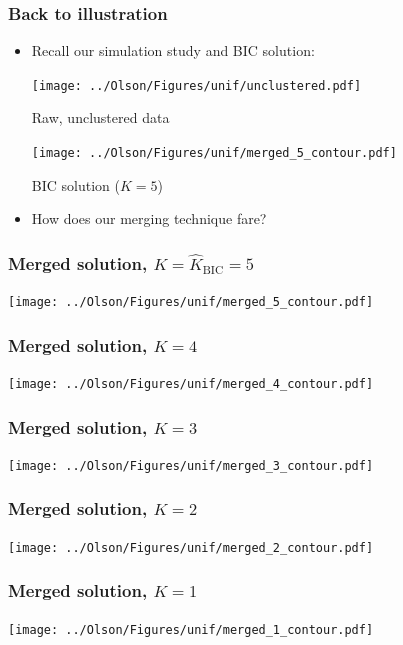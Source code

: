 \documentclass[mathserif,compress]{beamer}
\newcommand*\estim[1]{\widehat{#1}}
\renewcommand\;{\,}
\begin{document}
\begin{frame}\frametitle{Back to illustration}
\begin{itemize}
\item
Recall our simulation study and BIC solution:
\begin{minipage}{0.45\linewidth}
\texttt{[image: ../Olson/Figures/unif/unclustered.pdf]}
\begin{center}
Raw, unclustered data
\end{center}
\end{minipage}
\hfill
\begin{minipage}{0.45\linewidth}
\texttt{[image: ../Olson/Figures/unif/merged\_5\_contour.pdf]}
\begin{center}
BIC solution ($K = 5$)
\end{center}
\end{minipage}
\bigskip
\item
How does our merging technique fare?
\end{itemize}
\end{frame}

\begin{frame}\frametitle{Merged solution, $K = \estim K_\text{BIC} = 5$}
\begin{center}
\texttt{[image: ../Olson/Figures/unif/merged\_5\_contour.pdf]}
\end{center}
\end{frame}

\begin{frame}\frametitle{Merged solution, $K = 4$}
\begin{center}
\texttt{[image: ../Olson/Figures/unif/merged\_4\_contour.pdf]}
\end{center}
\end{frame}

\begin{frame}\frametitle{Merged solution, $K = 3$}
\begin{center}
\texttt{[image: ../Olson/Figures/unif/merged\_3\_contour.pdf]}
\end{center}
\end{frame}

\begin{frame}\frametitle{Merged solution, $K = 2$}
\begin{center}
\texttt{[image: ../Olson/Figures/unif/merged\_2\_contour.pdf]}
\end{center}
\end{frame}

\begin{frame}\frametitle{Merged solution, $K = 1$}
\begin{center}
\texttt{[image: ../Olson/Figures/unif/merged\_1\_contour.pdf]}
\end{center}
\end{frame}
\end{document}
